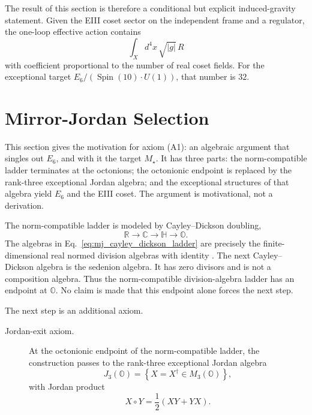 \documentclass[aps,prd,preprint,longbibliography,nofootinbib,superscriptaddress,floatfix]{revtex4-2}
\newcommand{\Spin}{\operatorname{Spin}}
\begin{document}
The result of this section is therefore a conditional but explicit
induced-gravity statement. Given the EIII coset sector on the independent frame
and a regulator, the one-loop effective action contains
\begin{equation}
    \int_X d^4x\,\sqrt{|g|}\,R
    \label{eq:induced_summary_term}
\end{equation}
with coefficient proportional to the number of real coset fields. For the
exceptional target \(E_6/(\Spin(10)\cdot U(1))\), that number is \(32\).


\section{Mirror-Jordan Selection}
\label{sec:mirror_jordan}

This section gives the motivation for axiom (A1): an algebraic argument that
singles out \(E_6\), and with it the target \(M_\star\). It has three parts: the
norm-compatible ladder terminates at the octonions; the octonionic endpoint is
replaced by the rank-three exceptional Jordan algebra; and the exceptional
structures of that algebra yield \(E_6\) and the EIII coset. The argument is
motivational, not a derivation.

The norm-compatible ladder is modeled by Cayley--Dickson doubling,
\begin{equation}
    \mathbb R
    \longrightarrow
    \mathbb C
    \longrightarrow
    \mathbb H
    \longrightarrow
    \mathbb O .
    \label{eq:mj_cayley_dickson_ladder}
\end{equation}
The algebras in Eq.~\eqref{eq:mj_cayley_dickson_ladder} are precisely the
finite-dimensional real normed division algebras with identity
\cite{Hurwitz,SpringerVeldkamp,BaezOctonions}. The next Cayley--Dickson algebra
is the sedenion algebra. It has zero divisors and is not a composition algebra.
Thus the norm-compatible division-algebra ladder has an endpoint at
\(\mathbb O\). No claim is made that this endpoint alone forces the next step.

The next step is an additional axiom.

\begin{description}
\item[Jordan-exit axiom.]
At the octonionic endpoint of the norm-compatible ladder, the construction
passes to the rank-three exceptional Jordan algebra
\begin{equation}
    J_3(\mathbb O)
    =
    \left\{
    X=X^\dagger\in M_3(\mathbb O)
    \right\},
    \label{eq:mj_albert_algebra}
\end{equation}
with Jordan product
\begin{equation}
    X\circ Y
    =
    \frac12(XY+YX).
    \label{eq:mj_jordan_product}
\end{equation}
\end{description}
\end{document}
